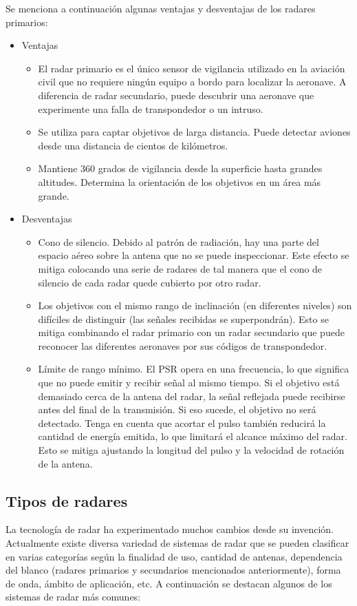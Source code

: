 Se menciona a continuación algunas ventajas y desventajas de los radares primarios:
\begin{itemize}
\item
Ventajas
	\begin{itemize}
	\item
El radar primario es el único sensor de vigilancia utilizado en la aviación civil que no requiere ningún equipo a bordo para localizar la aeronave. A diferencia de radar secundario, puede descubrir una aeronave que experimente una falla de transpondedor o un intruso.
	\item
Se utiliza para captar objetivos de larga distancia. Puede detectar aviones desde una distancia de cientos de kilómetros.
	\item
Mantiene 360 grados de vigilancia desde la superficie hasta grandes altitudes. Determina la orientación de los objetivos en un área más grande.
	\end{itemize}

\item
Desventajas
	\begin{itemize}
	\item
	Cono de silencio. Debido al patrón de radiación, hay una parte del espacio aéreo sobre la antena que no se puede inspeccionar. Este efecto se mitiga colocando una serie de radares de tal manera que el cono de silencio de cada radar quede cubierto por otro radar.
	\item
	Los objetivos con el mismo rango de inclinación (en diferentes niveles) son difíciles de distinguir (las señales recibidas se superpondrán). Esto se mitiga combinando el radar primario con un radar secundario que puede reconocer las diferentes aeronaves por sus códigos de transpondedor.
	\item
	Límite de rango mínimo. El PSR opera en una frecuencia, lo que significa que no puede emitir y recibir señal al mismo tiempo. Si el objetivo está demasiado cerca de la antena del radar, la señal reflejada puede recibirse antes del final de la transmisión. Si eso sucede, el objetivo no será detectado. Tenga en cuenta que acortar el pulso también reducirá la cantidad de energía emitida, lo que limitará el alcance máximo del radar. Esto se mitiga ajustando la longitud del pulso y la velocidad de rotación de la antena.
	\end{itemize}
\end{itemize}


\subsection{Tipos de radares}
La tecnología de radar ha experimentado muchos cambios desde su invención. Actualmente existe diversa variedad de sistemas de radar que se pueden clasificar en varias categorías según la finalidad de uso, cantidad de antenas, dependencia del blanco (radares primarios y secundarios mencionados anteriormente), forma de onda, ámbito de aplicación, etc. A continuación se destacan algunos de los sistemas de radar más comunes:

